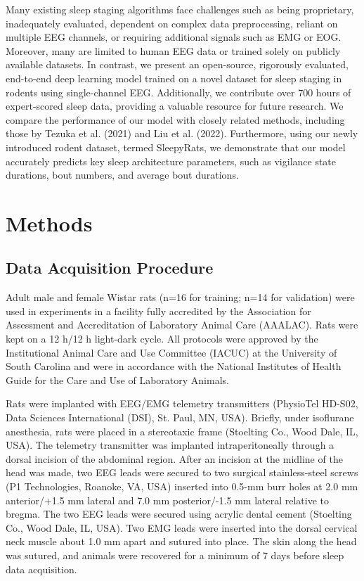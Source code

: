 \documentclass[pdflatex,sn-mathphys-num]{sn-jnl}%
\theoremstyle{thmstyleone}%
\theoremstyle{thmstyletwo}%
\theoremstyle{thmstylethree}%
\begin{document}
Many existing sleep staging algorithms face challenges such as being proprietary, inadequately evaluated, dependent on complex data preprocessing, reliant on multiple EEG channels, or requiring additional signals such as EMG or EOG. Moreover, many are limited to human EEG data or trained solely on publicly available datasets. In contrast, we present an open-source, rigorously evaluated, end-to-end deep learning model trained on a novel dataset for sleep staging in rodents using single-channel EEG. Additionally, we contribute over 700 hours of expert-scored sleep data, providing a valuable resource for future research. We compare the performance of our model with closely related methods, including those by Tezuka et al. (2021) and Liu et al. (2022). Furthermore, using our newly introduced rodent dataset, termed SleepyRats, we demonstrate that our model accurately predicts key sleep architecture parameters, such as vigilance state durations, bout numbers, and average bout durations.

\section{Methods}\label{methods}
\subsection*{Data Acquisition Procedure}
Adult male and female Wistar rats (n=16 for training; n=14 for validation) were used in experiments in a facility fully accredited by the Association for Assessment and Accreditation of Laboratory Animal Care (AAALAC). Rats were kept on a 12 h/12 h light-dark cycle. All protocols were approved by the Institutional Animal Care and Use Committee (IACUC) at the University of South Carolina and were in accordance with the National Institutes of Health Guide for the Care and Use of Laboratory Animals.

Rats were implanted with EEG/EMG telemetry transmitters (PhysioTel HD-S02, Data Sciences International (DSI), St. Paul, MN, USA). Briefly, under isoflurane anesthesia, rats were placed in a stereotaxic frame (Stoelting Co., Wood Dale, IL, USA). The telemetry transmitter was implanted intraperitoneally through a dorsal incision of the abdominal region. After an incision at the midline of the head was made, two EEG leads were secured to two surgical stainless-steel screws (P1 Technologies, Roanoke, VA, USA) inserted into 0.5-mm burr holes at 2.0 mm anterior/+1.5 mm lateral and 7.0 mm posterior/-1.5 mm lateral relative to bregma. The two EEG leads were secured using acrylic dental cement (Stoelting Co., Wood Dale, IL, USA). Two EMG leads were inserted into the dorsal cervical neck muscle about 1.0 mm apart and sutured into place. The skin along the head was sutured, and animals were recovered for a minimum of 7 days before sleep data acquisition.
\end{document}
